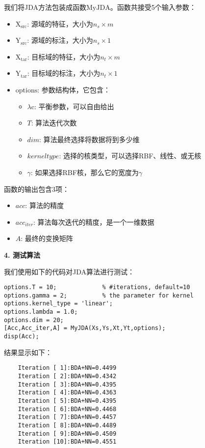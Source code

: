 我们将JDA方法包装成函数$\mathrm{MyJDA}$。函数共接受5个输入参数：

\begin{itemize}
	\item $\mathrm{X_{src}}$: 源域的特征，大小为$n_s \times m$
	\item $\mathrm{Y_{src}}$: 源域的标注，大小为$n_s \times 1$
	\item $\mathrm{X_{tar}}$: 目标域的特征，大小为$n_t \times m$
	\item $\mathrm{Y_{tar}}$: 目标域的标注，大小为$n_t \times 1$
	\item $\mathrm{options}$: 参数结构体，它包含：
	\begin{itemize}
		\item $\lambda$c: 平衡参数，可以自由给出
		\item $T$: 算法迭代次数
		\item $dim$: 算法最终选择将数据将到多少维
		\item $kernel type$: 选择的核类型，可以选择RBF、线性、或无核
		\item $\gamma$: 如果选择RBF核，那么它的宽度为$\gamma$
	\end{itemize}
\end{itemize}

函数的输出包含3项：
\begin{itemize}
	\item $acc$: 算法的精度
	\item $acc_{iter}$: 算法每次迭代的精度，是一个一维数据
	\item $A$: 最终的变换矩阵
\end{itemize}

\textbf{4. 测试算法}

我们使用如下的代码对JDA算法进行测试：

\begin{lstlisting}
options.T = 10;             % #iterations, default=10
options.gamma = 2;          % the parameter for kernel
options.kernel_type = 'linear';
options.lambda = 1.0;
options.dim = 20;
[Acc,Acc_iter,A] = MyJDA(Xs,Ys,Xt,Yt,options);
disp(Acc);
\end{lstlisting}

结果显示如下：
\begin{lstlisting}
	Iteration [ 1]:BDA+NN=0.4499
	Iteration [ 2]:BDA+NN=0.4342
	Iteration [ 3]:BDA+NN=0.4395
	Iteration [ 4]:BDA+NN=0.4363
	Iteration [ 5]:BDA+NN=0.4395
	Iteration [ 6]:BDA+NN=0.4468
	Iteration [ 7]:BDA+NN=0.4457
	Iteration [ 8]:BDA+NN=0.4489
	Iteration [ 9]:BDA+NN=0.4509
	Iteration [10]:BDA+NN=0.4551
\end{lstlisting}

